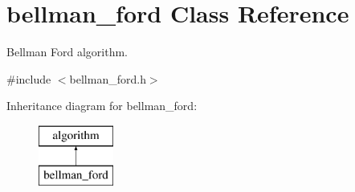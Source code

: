 \hypertarget{classbellman__ford}{}\section{bellman\+\_\+ford Class Reference}
\label{classbellman__ford}


Bellman Ford algorithm.  




{\ttfamily \#include $<$bellman\+\_\+ford.\+h$>$}

Inheritance diagram for bellman\+\_\+ford\+:\begin{figure}[H]
\begin{center}
\leavevmode
\includegraphics[height=2.000000cm]{classbellman__ford}
\end{center}
\end{figure}
